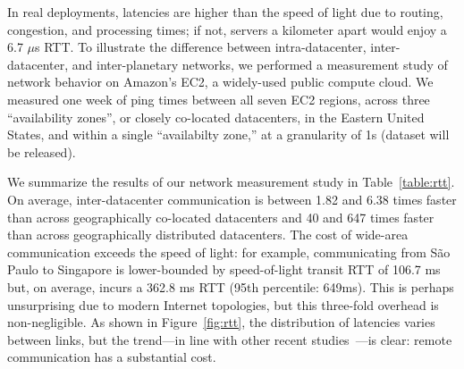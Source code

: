 In real deployments, latencies are higher than the speed of light due
to routing, congestion, and processing times; if not, servers a
kilometer apart would enjoy a 6.7 $\mu$s RTT. To illustrate the
difference between intra-datacenter, inter-datacenter, and
inter-planetary networks, we performed a measurement study of network
behavior on Amazon's EC2, a widely-used public compute cloud. We
measured one week of ping times between all seven EC2 regions, across
three ``availability zones'', or closely co-located datacenters, in
the Eastern United States, and within a single ``availabilty zone,''
at a granularity of 1s (dataset will be released).

We summarize the results of our network measurement study in
Table~\ref{table:rtt}. On average, inter-datacenter communication is
between 1.82 and 6.38 times faster than across geographically
co-located datacenters and 40 and 647 times faster than across
geographically distributed datacenters. The cost of wide-area
communication exceeds the speed of light: for example, communicating
from S\~{a}o Paulo to Singapore is lower-bounded by speed-of-light
transit RTT of 106.7 ms but, on average, incurs a 362.8 ms RTT (95th
percentile: 649ms). This is perhaps unsurprising due to modern
Internet topologies, but this three-fold overhead is
non-negligible. As shown in Figure~\ref{fig:rtt}, the distribution of
latencies varies between links, but the trend---in line with other
recent studies~\cite{redblue, mdcc}---is clear: remote communication
has a substantial cost.


